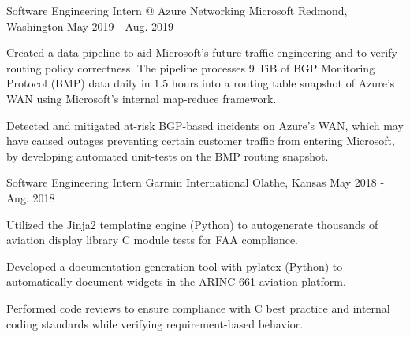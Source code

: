 

\begin{cventries}

\cventry
  {Software Engineering Intern @ Azure Networking} %
  {Microsoft} %
  {Redmond, Washington} %
  {May 2019 - Aug. 2019} %
  {
    \begin{cvitems} %
      \item {Created a data pipeline to aid Microsoft's future traffic
             engineering and to verify routing policy correctness. The pipeline
             processes 9 TiB of BGP Monitoring Protocol (BMP) data daily in 1.5 hours
             into a routing table snapshot of Azure's WAN using Microsoft's internal
             map-reduce framework.}
      \item{Detected and mitigated at-risk BGP-based incidents on Azure's WAN,
            which may have caused outages preventing certain customer traffic from
            entering Microsoft, by developing automated unit-tests on the BMP routing
            snapshot.}
    \end{cvitems}
  }


\cventry
  {Software Engineering Intern} %
  {Garmin International} %
  {Olathe, Kansas} %
  {May 2018 - Aug. 2018} %
  {
    \begin{cvitems} %
      \item {Utilized the Jinja2 templating engine (Python) to autogenerate
        thousands of aviation display library C module tests for FAA
        compliance.}
      \item {Developed a documentation generation tool with pylatex (Python) to
        automatically document widgets in the ARINC 661 aviation platform.}
      \item {Performed code reviews to ensure compliance with C best practice
        and internal coding standards while verifying requirement-based behavior.}
    \end{cvitems}
  }


\end{cventries}
